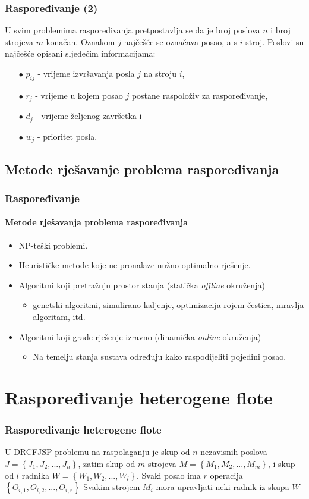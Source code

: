 \documentclass{beamer}
\begin{document}
\begin{frame}
\frametitle{Raspoređivanje (2)}
U svim problemima raspoređivanja pretpostavlja se da je
broj poslova $n$ i broj strojeva $m$ konačan. Oznakom $j$ najčešće se
označava posao, a s $i$ stroj. Poslovi su najčešće opisani sljedećim
informacijama:
\begin{itemize}
    \item[$\bullet$] $p_{ij}$ - vrijeme izvršavanja posla $j$ na stroju $i$,
    \item[$\bullet$] $r_{j}$ - vrijeme u kojem posao $j$ postane raspoloživ za raspoređivanje,
    \item[$\bullet$] $d_j$ - vrijeme željenog završetka i
    \item[$\bullet$] $w_j$ - prioritet posla.
\end{itemize}
\end{frame}

\subsection{Metode rješavanje problema raspoređivanja}
\begin{frame}
\frametitle{Raspoređivanje}
\framesubtitle{Metode rješavanja problema raspoređivanja}
\begin{itemize}
    \item NP-teški problemi.
    \item Heurističke metode koje ne pronalaze nužno optimalno rješenje.
    \item Algoritmi koji pretražuju prostor stanja (statička \textit{offline} okruženja)
    \begin{itemize}
        \item genetski algoritmi, simulirano kaljenje, optimizacija rojem čestica, mravlja algoritam, itd.
    \end{itemize}
    \item Algoritmi koji grade rješenje izravno (dinamička \textit{online} okruženja)
    \begin{itemize}
        \item Na temelju stanja sustava određuju kako raspodijeliti pojedini posao.
    \end{itemize}
\end{itemize}
\end{frame}

\section{Raspoređivanje heterogene flote}
\begin{frame}
\frametitle{Raspoređivanje heterogene flote}
U DRCFJSP problemu na raspolaganju je skup od $n$ nezavisnih poslova $J = \left\{J_1, J_2, ..., J_n\right\}$,
zatim skup od $m$ strojeva $M = \left\{M_1, M_2, ..., M_m\right\}$, i skup od $l$ radnika $W = \left\{W_1, W_2, ..., W_l\right\}$.
Svaki posao ima $r$ operacija $\left\{O_{i,1}, O_{i,2}, ..., O_{i,r}\right\}$ Svakim strojem $M_i$
mora upravljati neki radnik iz skupa $W$
\end{frame}
\end{document}
